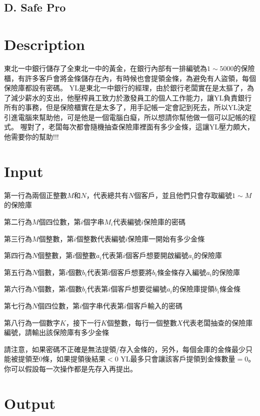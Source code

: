 \documentclass[11pt,a4paper]{article}
\begin{document}
\begin{center}
\section*{D. Safe Pro}
\end{center}

\section*{Description}


東北一中銀行儲存了全東北一中的黃金，在銀行內部有一排編號為$1\sim 5000$的保險櫃，有許多客戶會將金條儲存在內，有時候也會提領金條，為避免有人盜領，每個保險庫都設有密碼。
YL是東北一中銀行的經理，由於銀行老闆實在是太摳了，為了減少薪水的支出，他壓榨員工致力於激發員工的個人工作能力，讓YL負責銀行所有的事務，但是保險櫃實在是太多了，用手記帳一定會記到死去，所以YL決定引進電腦來幫助他，可是他是一個電腦白癡，所以想請你幫他做一個可以記帳的程式。
喔對了，老闆每次都會隨機抽查保險庫裡面有多少金條，這讓YL壓力頗大，他需要你的幫助!!!


\section*{Input}

第一行為兩個正整數$M$和$N$，代表總共有$N$個客戶，並且他們只會存取編號$1\sim M$的保險庫

第二行為$M$個四位數，第$i$個字串$M_i$代表編號$i$保險庫的密碼

第三行為$M$個整數，第$i$個整數代表編號$i$保險庫一開始有多少金條

第四行為$N$個整數，第$i$個整數$a_i$代表第$i$個客戶想要開啟編號$a_i$的保險庫

第五行為$N$個數，第$i$個數$b_i$代表第i個客戶想要將$b_i$條金條存入編號$a_i$的保險庫

第六行為$N$個數，第$i$個數$b_i$代表第$i$個客戶想要從編號$a_i$的保險庫提領$b_i$條金條

第七行為$N$個四位數，第$i$個字串代表第$i$個客戶輸入的密碼

第八行為一個數字$K$，接下一行$K$個整數，每行一個整數$X$代表老闆抽查的保險庫編號，請輸出該保險庫有多少金條

請注意，如果密碼不正確是無法提領/存入金條的，另外，每個金庫的金條最少只能被提領至$0$條，如果提領後結果$<0$ YL最多只會讓該客戶提領到金條數量$=0$。你可以假設每一次操作都是先存入再提出。


\section*{Output}
\end{document}
